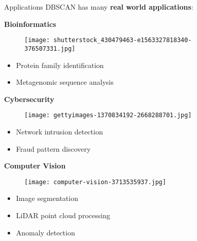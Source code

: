 \documentclass[aspectratio=169]{beamer}
\begin{document}
\begin{frame}{Applications}
    DBSCAN has many \textbf{real world applications}:

    \vspace{0.3cm}

    \begin{minipage}{0.3\textwidth}
        \centering
        \textbf{Bioinformatics}
        \begin{figure}
            \centering
            \texttt{[image: shutterstock\_430479463-e1563327818340-376507331.jpg]}
        \end{figure}
        \begin{itemize}
        \item Protein family identification
        \item Metagenomic sequence analysis
    \end{itemize}
    \end{minipage}
    \begin{minipage}{0.3\textwidth}
        \centering
        \textbf{Cybersecurity}
        \begin{figure}
            \centering
            \texttt{[image: gettyimages-1370834192-2668288701.jpg]}
        \end{figure}
        \begin{itemize}
        \item Network intrusion detection
        \item Fraud pattern discovery
    \end{itemize}
    \end{minipage}
    \begin{minipage}{0.3\textwidth}
        \centering
        \textbf{Computer Vision}
        \begin{figure}
            \centering
            \texttt{[image: computer-vision-3713535937.jpg]}
        \end{figure}
        \begin{itemize}
        \item Image segmentation
        \item LiDAR point cloud processing
        \item Anomaly detection
    \end{itemize}
    \end{minipage}
\end{frame}
\end{document}
